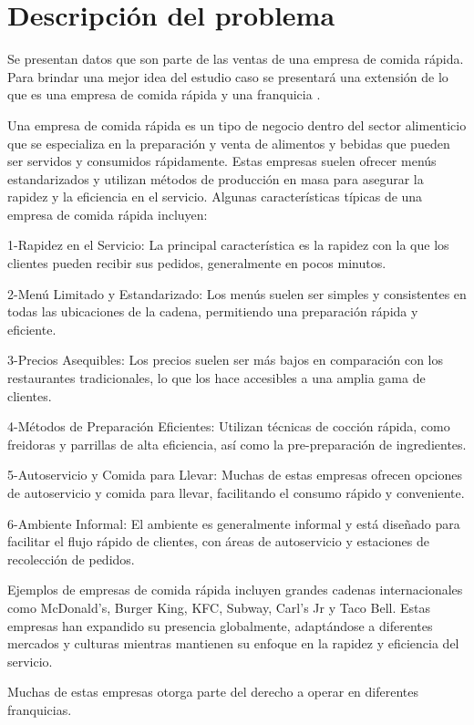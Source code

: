 \documentclass[
  us-letterpaper,
]{scrreprt}
\theoremstyle{plain}
\theoremstyle{plain}
\theoremstyle{definition}
\theoremstyle{remark}
\begin{document}
\section{Descripción del problema}\label{descripciuxf3n-del-problema}

Se presentan datos que son parte de las ventas de una empresa de comida
rápida. Para brindar una mejor idea del estudio caso se presentará una
extensión de lo que es una empresa de comida rápida y una franquicia .

Una empresa de comida rápida es un tipo de negocio dentro del sector
alimenticio que se especializa en la preparación y venta de alimentos y
bebidas que pueden ser servidos y consumidos rápidamente. Estas empresas
suelen ofrecer menús estandarizados y utilizan métodos de producción en
masa para asegurar la rapidez y la eficiencia en el servicio. Algunas
características típicas de una empresa de comida rápida incluyen:

1-Rapidez en el Servicio: La principal característica es la rapidez con
la que los clientes pueden recibir sus pedidos, generalmente en pocos
minutos.

2-Menú Limitado y Estandarizado: Los menús suelen ser simples y
consistentes en todas las ubicaciones de la cadena, permitiendo una
preparación rápida y eficiente.

3-Precios Asequibles: Los precios suelen ser más bajos en comparación
con los restaurantes tradicionales, lo que los hace accesibles a una
amplia gama de clientes.

4-Métodos de Preparación Eficientes: Utilizan técnicas de cocción
rápida, como freidoras y parrillas de alta eficiencia, así como la
pre-preparación de ingredientes.

5-Autoservicio y Comida para Llevar: Muchas de estas empresas ofrecen
opciones de autoservicio y comida para llevar, facilitando el consumo
rápido y conveniente.

6-Ambiente Informal: El ambiente es generalmente informal y está
diseñado para facilitar el flujo rápido de clientes, con áreas de
autoservicio y estaciones de recolección de pedidos.

Ejemplos de empresas de comida rápida incluyen grandes cadenas
internacionales como McDonald's, Burger King, KFC, Subway, Carl's Jr y
Taco Bell. Estas empresas han expandido su presencia globalmente,
adaptándose a diferentes mercados y culturas mientras mantienen su
enfoque en la rapidez y eficiencia del servicio.

Muchas de estas empresas otorga parte del derecho a operar en diferentes
franquicias.
\end{document}
